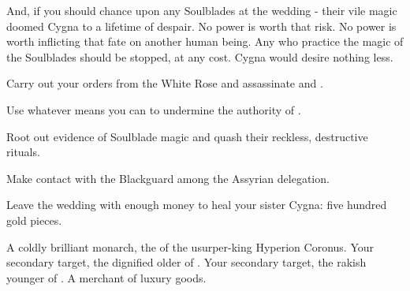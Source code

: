 \documentclass[char]{Kos}
\begin{document}
    And, if you should chance upon any Soulblades at the wedding - their vile magic doomed Cygna to a lifetime of despair. No power is worth that risk. No power is worth inflicting that fate on another human being. Any who practice the magic of the Soulblades should be stopped, at any cost. Cygna would desire nothing less.

\begin{itemz}[Goals]
\item Carry out your orders from the White Rose and assassinate \cGroom{} and \cPoet{}.
\item Use whatever means you can to undermine the authority of \cEtruriaKing{\Monarch} \cEtruriaKing{}.
\item Root out evidence of Soulblade magic and quash their reckless, destructive rituals.
\item Make contact with the Blackguard among the Assyrian delegation.
\item Leave the wedding with enough money to heal your sister Cygna: five hundred gold pieces.
\end{itemz}

\begin{contacts}
\contact{\cEtruriaKing{}} A coldly brilliant monarch, the \cEtruriaKing{\offspring} of the usurper-king Hyperion Coronus.
\contact{\cGroom{}} Your secondary target, the dignified older \cGroom{\offspring} of  \cEtruriaKing{\Monarch} \cEtruriaKing{}.
\contact{\cPoet{}} Your secondary target, the rakish younger \cPoet{\offspring} of  \cEtruriaKing{\Monarch} \cEtruriaKing{}.
\contact{\cMerchant{}} A merchant of luxury goods.
\end{contacts}
\end{document}
